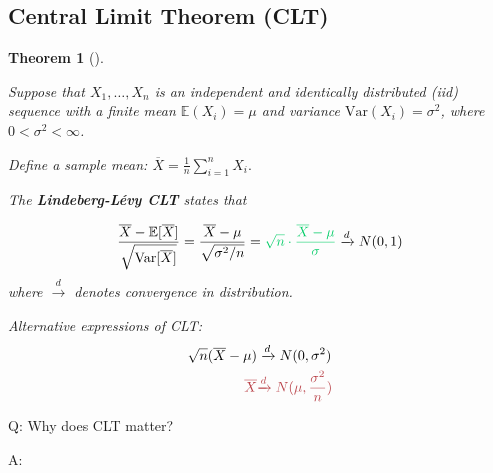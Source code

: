 \documentclass[
  12pt,
]{scrbook}
\newcommand{\red}[1]{\color[RGB]{185,64,71}{#1}}
\theoremstyle{plain}
\newtheorem{theorem}{Theorem}[section]
\theoremstyle{definition}
\theoremstyle{remark}
\begin{document}
\subsection{Central Limit Theorem
(CLT)}\label{central-limit-theorem-clt}

\begin{theorem}[]\protect\hypertarget{thm-clt}{}\label{thm-clt}

Suppose that \(X_1, \ldots, X_n\) is an independent and identically
distributed (iid) sequence with a finite mean \(\mathbb{E}(X_i)=\mu\)
and variance \(\text{Var}(X_i)=\sigma^2\), where \(0<\sigma^2<\infty\).

Define a sample mean: \(\overline{X}=\frac{1}{n}\sum_{i=1}^n X_i.\)

The {\textbf{Lindeberg-Lévy CLT}} states that

\[
\frac{\overline{X}-\mathbb{E}[\overline{X}]}{\sqrt{\text{Var}[\overline{X}]}}
= \frac{\overline{X}-\mu}{\sqrt{\sigma^2/n}}
= {\color[HTML]{00CC66} \sqrt{n} \cdot \frac{\overline{X}-\mu}{\sigma} }
\xrightarrow{d} N(0,1)
\] where \(\xrightarrow{d}\) denotes convergence in distribution.

Alternative expressions of CLT: \[
\begin{split}
\sqrt{n} (\overline{X}-\mu)  & \xrightarrow{d} N(0,\sigma^2) \\
\red{\overline{X}} & \red{\xrightarrow{d} N(\mu, \frac{\sigma^2}{n})}
\end{split}
\]

\end{theorem}

Q: Why does CLT matter?

A:
\end{document}
